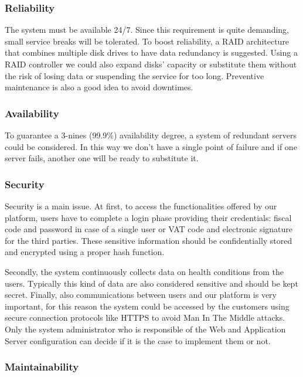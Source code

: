 \subsubsection{Reliability}

The system must be available 24/7. Since this requirement is quite demanding, small service breaks will be tolerated. To boost reliability, a RAID architecture that combines multiple disk drives to have data redundancy is suggested. Using a RAID controller we could also expand disks' capacity or substitute them without the risk of losing data or suspending the service for too long. Preventive maintenance is also a good idea to avoid downtimes.

\subsubsection{Availability}

To guarantee a 3-nines (99.9\%) availability degree, a system of redundant servers could be considered. In this way we don't have a single point of failure and if one server fails, another one will be ready to substitute it.

\subsubsection{Security}

Security is a main issue.  At first, to access the functionalities offered by our platform, users have to complete a login phase providing their credentials: fiscal code and password in case of a single user or VAT code and electronic signature for the third parties. These sensitive information should be confidentially stored and encrypted using a proper hash function.

Secondly, the system  continuously collects data on health conditions from the users. Typically this kind of data are also considered sensitive and should be kept secret. Finally, also communications between users and our platform is very important, for this reason the system could be accessed by the customers using secure connection protocols like HTTPS to avoid Man In The Middle attacks. Only the system administrator who is responsible of the Web and Application Server configuration can decide if it is the case to implement them or not.

\subsubsection{Maintainability}

